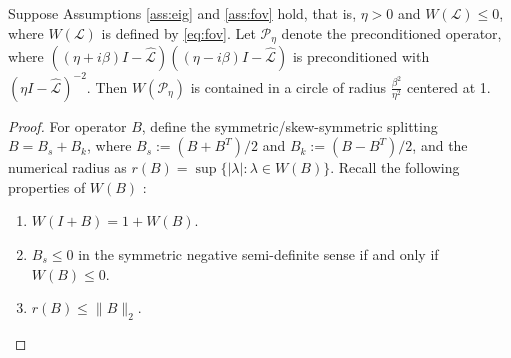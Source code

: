 \documentclass[review]{siamart}
\begin{document}
%
\begin{theorem}\label{th:fov}
Suppose Assumptions \ref{ass:eig} and \ref{ass:fov} hold, that is, $\eta > 0$
and $W(\mathcal{L}) \leq 0$, where $W(\mathcal{L})$ is defined by \eqref{eq:fov}.
Let $\mathcal{P}_\eta$ denote the
preconditioned operator, where $((\eta + i\beta)I -
\widehat{\mathcal{L}})((\eta - i\beta)I - \widehat{\mathcal{L}})$ is
preconditioned with $(\eta I - \widehat{\mathcal{L}})^{-2}$. Then
$W(\mathcal{P}_\eta)$ is contained in a circle of radius
$\tfrac{\beta^2}{\eta^2}$ centered at 1.
\end{theorem}
\begin{proof}
For operator $B$, define the symmetric/skew-symmetric splitting
$B = B_s + B_k$, where $B_s := (B+B^T)/2$ and $B_k := (B - B^T)/2$, and
the numerical radius as $r(B) = \sup \{ |\lambda| : \lambda \in W(B) \}$. Recall
the following properties of $W(B)$ \cite{gustafson1997numerical,mees1979domains}:
%
\begin{enumerate}
	\item $W(I + B) = 1 + W(B)$.

	\item $B_s \leq 0$ in the symmetric negative semi-definite sense
	if and only if $W(B) \leq 0$.

	\item $r(B) \leq \|B\|_2$.


\end{enumerate}
\end{proof}
\end{document}
